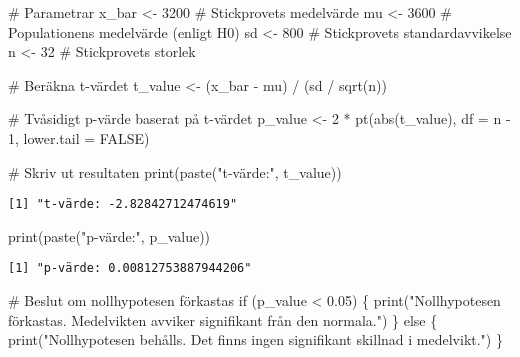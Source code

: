 \documentclass[
  letterpaper,
  DIV=11,
  numbers=noendperiod]{scrartcl}
\newenvironment{Shaded}{\begin{snugshade}}{\end{snugshade}}
\newcommand{\AttributeTok}[1]{\textcolor[rgb]{0.40,0.45,0.13}{#1}}
\newcommand{\CommentTok}[1]{\textcolor[rgb]{0.37,0.37,0.37}{#1}}
\newcommand{\ConstantTok}[1]{\textcolor[rgb]{0.56,0.35,0.01}{#1}}
\newcommand{\ControlFlowTok}[1]{\textcolor[rgb]{0.00,0.23,0.31}{#1}}
\newcommand{\DecValTok}[1]{\textcolor[rgb]{0.68,0.00,0.00}{#1}}
\newcommand{\FloatTok}[1]{\textcolor[rgb]{0.68,0.00,0.00}{#1}}
\newcommand{\FunctionTok}[1]{\textcolor[rgb]{0.28,0.35,0.67}{#1}}
\newcommand{\NormalTok}[1]{\textcolor[rgb]{0.00,0.23,0.31}{#1}}
\newcommand{\OtherTok}[1]{\textcolor[rgb]{0.00,0.23,0.31}{#1}}
\newcommand{\SpecialCharTok}[1]{\textcolor[rgb]{0.37,0.37,0.37}{#1}}
\newcommand{\StringTok}[1]{\textcolor[rgb]{0.13,0.47,0.30}{#1}}
\begin{document}
\begin{Shaded}
\begin{Highlighting}[]
\CommentTok{\# Parametrar}
\NormalTok{x\_bar }\OtherTok{\textless{}{-}} \DecValTok{3200}        \CommentTok{\# Stickprovets medelvärde}
\NormalTok{mu }\OtherTok{\textless{}{-}} \DecValTok{3600}           \CommentTok{\# Populationens medelvärde (enligt H0)}
\NormalTok{sd }\OtherTok{\textless{}{-}} \DecValTok{800}            \CommentTok{\# Stickprovets standardavvikelse}
\NormalTok{n }\OtherTok{\textless{}{-}} \DecValTok{32}              \CommentTok{\# Stickprovets storlek}

\CommentTok{\# Beräkna t{-}värdet}
\NormalTok{t\_value }\OtherTok{\textless{}{-}}\NormalTok{ (x\_bar }\SpecialCharTok{{-}}\NormalTok{ mu) }\SpecialCharTok{/}\NormalTok{ (sd }\SpecialCharTok{/} \FunctionTok{sqrt}\NormalTok{(n))}

\CommentTok{\# Tvåsidigt p{-}värde baserat på t{-}värdet}
\NormalTok{p\_value }\OtherTok{\textless{}{-}} \DecValTok{2} \SpecialCharTok{*} \FunctionTok{pt}\NormalTok{(}\FunctionTok{abs}\NormalTok{(t\_value), }\AttributeTok{df =}\NormalTok{ n }\SpecialCharTok{{-}} \DecValTok{1}\NormalTok{, }\AttributeTok{lower.tail =} \ConstantTok{FALSE}\NormalTok{)}

\CommentTok{\# Skriv ut resultaten}
\FunctionTok{print}\NormalTok{(}\FunctionTok{paste}\NormalTok{(}\StringTok{"t{-}värde:"}\NormalTok{, t\_value))}
\end{Highlighting}
\end{Shaded}

\begin{verbatim}
[1] "t-värde: -2.82842712474619"
\end{verbatim}

\begin{Shaded}
\begin{Highlighting}[]
\FunctionTok{print}\NormalTok{(}\FunctionTok{paste}\NormalTok{(}\StringTok{"p{-}värde:"}\NormalTok{, p\_value))}
\end{Highlighting}
\end{Shaded}

\begin{verbatim}
[1] "p-värde: 0.00812753887944206"
\end{verbatim}

\begin{Shaded}
\begin{Highlighting}[]
\CommentTok{\# Beslut om nollhypotesen förkastas}
\ControlFlowTok{if}\NormalTok{ (p\_value }\SpecialCharTok{\textless{}} \FloatTok{0.05}\NormalTok{) \{}
  \FunctionTok{print}\NormalTok{(}\StringTok{"Nollhypotesen förkastas. Medelvikten avviker signifikant från den normala."}\NormalTok{)}
\NormalTok{\} }\ControlFlowTok{else}\NormalTok{ \{}
  \FunctionTok{print}\NormalTok{(}\StringTok{"Nollhypotesen behålls. Det finns ingen signifikant skillnad i medelvikt."}\NormalTok{)}
\NormalTok{\}}
\end{Highlighting}
\end{Shaded}
\end{document}
